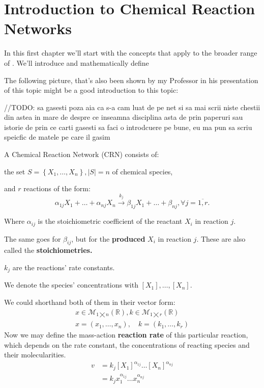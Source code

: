 \chapter{Introduction to Chemical Reaction Networks}\label{chap:ch1}

In this first chapter we'll start with the concepts that apply to the broader range of . We'll introduce and mathematically define

The following picture, that's also been shown by my Professor in his presentation of this topic might be a good introduction to this topic:

\hfill\break
//TODO: sa gasesti poza aia ca s-a cam luat de pe net
si sa mai scrii niste chestii din astea in mare de despre ce inseamna disciplina asta de prin paperuri sau istorie de prin ce carti gasesti sa faci o introdcuere pe bune, eu ma pun sa scriu speicfic de matele pe care il gasim
\hfill\break

A Chemical Reaction Network (CRN) consists of:

the set $S = \left\{ X_1, \dots, X_n \right\}, \left| S \right| = n$ of chemical species,

and $r$ reactions of the form:
\begin{equation}\label{mass-action_network}
	\alpha_{1j} X_1 + \dots + \alpha_{n j} X_n \xrightarrow{k_j} \beta_{1j} X_1 + \dots + \beta_{n j}, \forall j = \overline{1,r}.	
\end{equation}

Where $\alpha_{ij}$ is the stoichiometric coefficient of the reactant $X_i$ in reaction $j$.

The same goes for $\beta_{ij}$, but for the \textbf{produced} $X_i$ in reaction $j$. These are also called the \textbf{stoichiometries.}

$k_j$ are the reactions' rate constants.

We denote the species' concentrations with $[X_1], \dots, [X_n]$.

We could shorthand both of them in their vector form:
\begin{gather*}
	x \in \mathcal{M}_{1 \bigtimes n}(\mathbb{R}),  k \in \mathcal{M}_{1 \bigtimes r}(\mathbb{R}) \\
	x = (x_1, \ldots, x_n), \quad k = (k_1, \ldots, k_r)	
\end{gather*}
Now we may define the mass-action \textbf{reaction rate} of this particular reaction, which depends on the rate constant, the concentrations of reacting species and their molecularities.
\begin{align}\label{reaction_rate}
	v &= k_j [X_1]^{\alpha_{1j}} \dots [X_n]^{\alpha_{nj}} \\
	&= k_j x_1^{\alpha_{1j}} \dots x_n^{\alpha_{nj}} \nonumber
\end{align}

